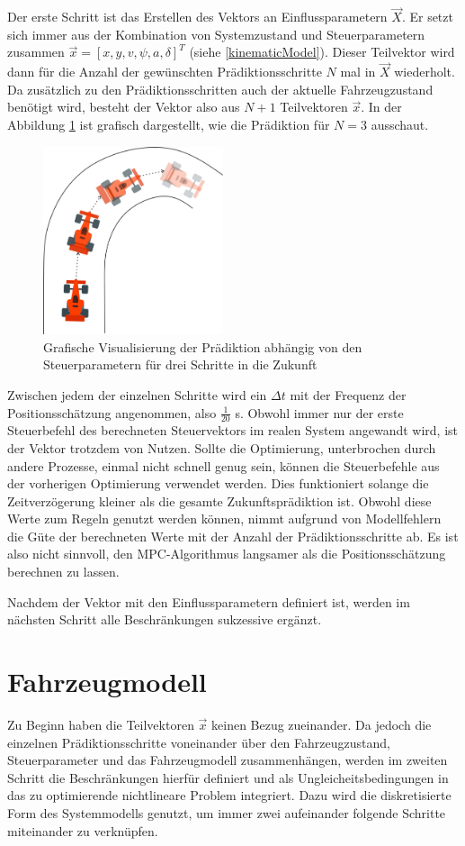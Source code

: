 \documentclass{like}
\begin{document}
Der erste Schritt ist das Erstellen des Vektors an Einflussparametern $\vec{X}$. Er setzt sich immer aus der Kombination von Systemzustand und Steuerparametern zusammen  $\vec{x} = [x, y, v, \psi, a, \delta ]^T $ (siehe \ref{kinematicModel}). 
Dieser Teilvektor wird dann für die Anzahl der gewünschten Prädiktionsschritte \(N\) mal in $\vec{X}$ wiederholt. Da zusätzlich zu den Prädiktionsschritten auch der aktuelle Fahrzeugzustand benötigt wird, besteht der Vektor also aus $N+1$ Teilvektoren $\vec{x}$. In der Abbildung \ref{fig:predictionMpc} ist grafisch dargestellt, wie die Prädiktion für $N=3$ ausschaut.
\begin{figure}[ht!]
	\centering
	\includegraphics[width=150pt]{Abbildungen/predictionMPC.png}
	\caption{Grafische Visualisierung der Prädiktion abhängig von den Steuerparametern für drei Schritte in die Zukunft}
	\label{fig:predictionMpc}
\end{figure}
Zwischen jedem der einzelnen Schritte wird ein $\Delta t$ mit der Frequenz der Positionsschätzung angenommen, also $\frac{1}{20}$ s. Obwohl immer nur der erste Steuerbefehl des berechneten Steuervektors im realen System angewandt wird, ist der Vektor trotzdem von Nutzen. Sollte die Optimierung, unterbrochen durch andere Prozesse, einmal nicht schnell genug sein, können die Steuerbefehle aus der vorherigen Optimierung verwendet werden. Dies funktioniert solange die Zeitverzögerung kleiner als die gesamte Zukunftsprädiktion ist. Obwohl diese Werte zum Regeln genutzt werden können, nimmt aufgrund von Modellfehlern die Güte der berechneten Werte mit der Anzahl der Prädiktionsschritte ab. Es ist also nicht sinnvoll, den \ac{MPC}-Algorithmus langsamer als die Positionsschätzung berechnen zu lassen. 

  

Nachdem der Vektor mit den Einflussparametern definiert ist, werden im nächsten Schritt alle Beschränkungen sukzessive ergänzt.

\section{Fahrzeugmodell}
Zu Beginn haben die Teilvektoren $\vec{x}$ keinen Bezug zueinander. Da jedoch die einzelnen Prädiktionsschritte voneinander über den Fahrzeugzustand, Steuerparameter und das Fahrzeugmodell zusammenhängen, werden im zweiten Schritt die Beschränkungen hierfür definiert und als Ungleicheitsbedingungen in das zu optimierende nichtlineare Problem integriert. Dazu wird die diskretisierte Form des Systemmodells genutzt, um immer zwei aufeinander folgende Schritte miteinander zu verknüpfen. 
\end{document}
